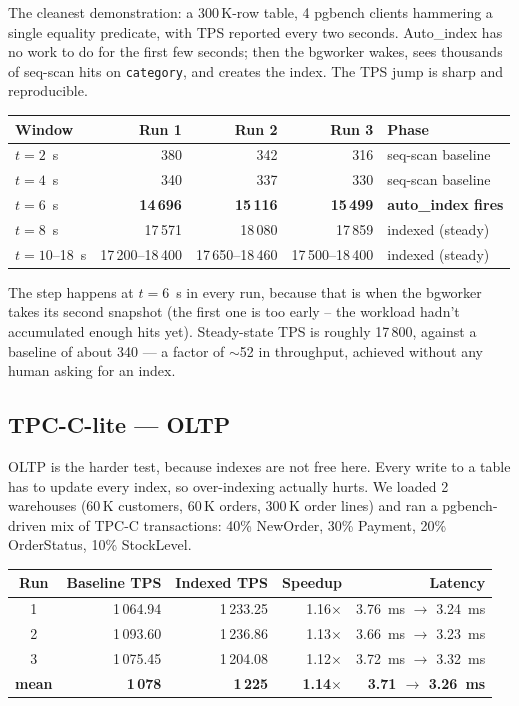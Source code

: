\documentclass[10pt,a4paper]{article}
\newcommand{\code}[1]{\texttt{\small #1}}
\begin{document}
The cleanest demonstration: a 300\,K-row table, 4 pgbench clients
hammering a single equality predicate, with TPS reported every two
seconds. Auto\_index has no work to do for the first few seconds;
then the bgworker wakes, sees thousands of seq-scan hits on
\code{category}, and creates the index. The TPS jump is sharp and
reproducible.

\begin{table}[h]
\centering\small
\begin{tabular}{lrrrl}
\toprule
\textbf{Window} & \textbf{Run 1} & \textbf{Run 2} & \textbf{Run 3} & \textbf{Phase} \\
\midrule
$t=2$~s        & 380     & 342     & 316     & seq-scan baseline \\
$t=4$~s        & 340     & 337     & 330     & seq-scan baseline \\
$t=6$~s        & \textbf{14\,696} & \textbf{15\,116} & \textbf{15\,499} & \textbf{auto\_index fires} \\
$t=8$~s        & 17\,571 & 18\,080 & 17\,859 & indexed (steady) \\
$t=10$--18~s   & 17\,200--18\,400 & 17\,650--18\,460 & 17\,500--18\,400 & indexed (steady) \\
\bottomrule
\end{tabular}
\end{table}

The step happens at $t=6$~s in every run, because that is when the
bgworker takes its second snapshot (the first one is too early --
the workload hadn't accumulated enough hits yet). Steady-state TPS
is roughly 17\,800, against a baseline of about 340 --- a factor of
$\sim$52 in throughput, achieved without any human asking for an
index.

\subsection*{TPC-C-lite --- OLTP}

OLTP is the harder test, because indexes are not free here. Every
write to a table has to update every index, so over-indexing
actually hurts. We loaded 2 warehouses (60\,K customers, 60\,K
orders, 300\,K order lines) and ran a pgbench-driven mix of TPC-C
transactions: 40\% NewOrder, 30\% Payment, 20\% OrderStatus, 10\%
StockLevel.

\begin{table}[h]
\centering\small
\begin{tabular}{crrrr}
\toprule
\textbf{Run} & \textbf{Baseline TPS} & \textbf{Indexed TPS} & \textbf{Speedup} & \textbf{Latency} \\
\midrule
1            & 1\,064.94 & 1\,233.25 & 1.16$\times$ & 3.76~ms $\to$ 3.24~ms \\
2            & 1\,093.60 & 1\,236.86 & 1.13$\times$ & 3.66~ms $\to$ 3.23~ms \\
3            & 1\,075.45 & 1\,204.08 & 1.12$\times$ & 3.72~ms $\to$ 3.32~ms \\
\midrule
\textbf{mean} & \textbf{1\,078} & \textbf{1\,225} & \textbf{1.14$\times$} & \textbf{3.71 $\to$ 3.26~ms} \\
\bottomrule
\end{tabular}
\end{table}
\end{document}
